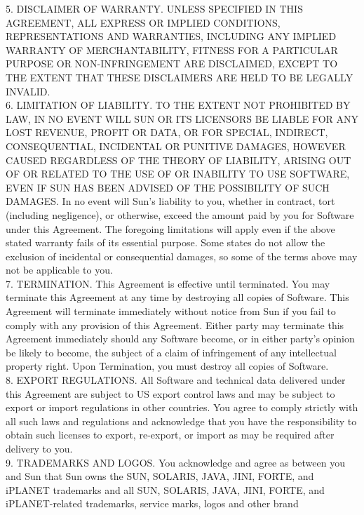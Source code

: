 {   5. DISCLAIMER OF WARRANTY. UNLESS SPECIFIED IN THIS AGREEMENT, ALL
   EXPRESS OR IMPLIED CONDITIONS, REPRESENTATIONS AND WARRANTIES,
   INCLUDING ANY IMPLIED WARRANTY OF MERCHANTABILITY, FITNESS FOR A
   PARTICULAR PURPOSE OR NON-INFRINGEMENT ARE DISCLAIMED, EXCEPT TO
   THE EXTENT THAT THESE DISCLAIMERS ARE HELD TO BE LEGALLY INVALID.
\\[4pt]
   6. LIMITATION OF LIABILITY. TO THE EXTENT NOT PROHIBITED BY LAW, IN
   NO EVENT WILL SUN OR ITS LICENSORS BE LIABLE FOR ANY LOST REVENUE,
   PROFIT OR DATA, OR FOR SPECIAL, INDIRECT, CONSEQUENTIAL, INCIDENTAL
   OR PUNITIVE DAMAGES, HOWEVER CAUSED REGARDLESS OF THE THEORY OF
   LIABILITY, ARISING OUT OF OR RELATED TO THE USE OF OR INABILITY TO
   USE SOFTWARE, EVEN IF SUN HAS BEEN ADVISED OF THE POSSIBILITY OF
   SUCH DAMAGES. In no event will Sun's liability to you, whether in
   contract, tort (including negligence), or otherwise, exceed the
   amount paid by you for Software under this Agreement. The foregoing
   limitations will apply even if the above stated warranty fails of
   its essential purpose. Some states do not allow the exclusion of
   incidental or consequential damages, so some of the terms above may
   not be applicable to you.
\\[4pt]
   7. TERMINATION. This Agreement is effective until terminated. You
   may terminate this Agreement at any time by destroying all copies
   of Software. This Agreement will terminate immediately without
   notice from Sun if you fail to comply with any provision of this
   Agreement. Either party may terminate this Agreement immediately
   should any Software become, or in either party's opinion be likely
   to become, the subject of a claim of infringement of any
   intellectual property right. Upon Termination, you must destroy all
   copies of Software.
\\[4pt]
   8. EXPORT REGULATIONS. All Software and technical data delivered
   under this Agreement are subject to US export control laws and may
   be subject to export or import regulations in other countries. You
   agree to comply strictly with all such laws and regulations and
   acknowledge that you have the responsibility to obtain such
   licenses to export, re-export, or import as may be required after
   delivery to you.
\\[4pt]
   9. TRADEMARKS AND LOGOS. You acknowledge and agree as between you
   and Sun that Sun owns the SUN, SOLARIS, JAVA, JINI, FORTE, and
   iPLANET trademarks and all SUN, SOLARIS, JAVA, JINI, FORTE, and
   iPLANET-related trademarks, service marks, logos and other brand
}
